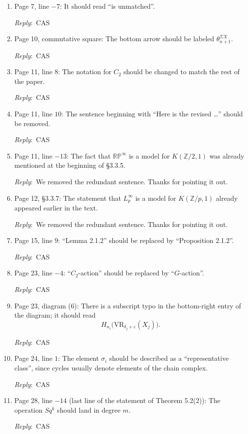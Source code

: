 \documentclass{amsart}
\newcommand{\ar}{\medskip\noindent\textit{Reply}:\ }
\begin{document}
	\begin{enumerate}
		\item Page 7, line $-7$: It should read ``is unmatched''.

		\ar CAS

		\item Page 10, commutative square: The bottom arrow should be labeled \(\theta_{n+1}^{\Sigma X}\).

		\ar CAS

		\item Page 11, line $8$: The notation for \(C_2\) should be changed to match the rest of the paper.

		\ar CAS

		\item Page 11, line $10$: The sentence beginning with ``Here is the revised \ldots'' should be removed.

		\ar CAS

		\item Page 11, line $-13$: The fact that \(\mathbb{RP}^{\infty}\) is a model for \(K(\mathbb{Z}/2,1)\) was already mentioned at the beginning of \S 3.3.5.

		\ar We removed the redundant sentence.
		Thanks for pointing it out.

		\item Page 12, \S 3.3.7: The statement that \(L_p^{\infty}\) is a model for \(K(\mathbb{Z}/p,1)\) already appeared earlier in the text.

		\ar We removed the redundant sentence.
		Thanks for pointing it out.

		\item Page 15, line $9$: ``Lemma 2.1.2'' should be replaced by ``Proposition 2.1.2''.

		\ar CAS

		\item Page 23, line $-4$: ``\(C_2\)-action'' should be replaced by ``\(G\)-action''.

		\ar CAS

		\item Page 23, diagram (6): There is a subscript typo in the bottom-right entry of the diagram; it should read
		\[
		H_{n_i}\!\bigl(\mathrm{VR}_{\delta_j + \varepsilon}(X_j)\bigr).
		\]

		\ar CAS

		\item Page 24, line $1$: The element \(\sigma_i\) should be described as a ``representative class'', since cycles usually denote elements of the chain complex.

		\ar CAS

		\item Page 28, line $-14$ (last line of the statement of Theorem 5.2(2)): The operation \(Sq^k\) should land in degree \(m\).

		\ar CAS
	\end{enumerate}
\end{document}
